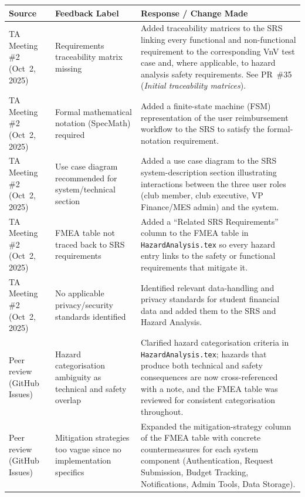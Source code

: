 \documentclass{article}
\begin{document}
\begin{longtable}{p{3.2cm} p{3.8cm} p{7.4cm}}
\toprule
\textbf{Source} & \textbf{Feedback Label} & \textbf{Response / Change Made} \\
\midrule
\endhead

TA Meeting \#2 (Oct~2, 2025)
  & Requirements traceability matrix missing
  & Added traceability matrices to the SRS linking every functional and
    non-functional requirement to the corresponding VnV test case and, where
    applicable, to hazard analysis safety requirements.
    See PR~\#35 (\textit{Initial traceability matrices}).
\\[4pt]

TA Meeting \#2 (Oct~2, 2025)
  & Formal mathematical notation (SpecMath) required
  & Added a finite-state machine (FSM) representation of the user
    reimbursement workflow to the SRS to satisfy the formal-notation
    requirement.
\\[4pt]

TA Meeting \#2 (Oct~2, 2025)
  & Use case diagram recommended for system/technical section
  & Added a use case diagram to the SRS system-description section
    illustrating interactions between the three user roles (club member,
    club executive, VP Finance/MES admin) and the system.
\\[4pt]

TA Meeting \#2 (Oct~2, 2025)
  & FMEA table not traced back to SRS requirements
  & Added a ``Related SRS Requirements'' column to the FMEA table in
    \texttt{HazardAnalysis.tex} so every hazard entry links to the safety
    or functional requirements that mitigate it.
\\[4pt]

TA Meeting \#2 (Oct~2, 2025)
  & No applicable privacy/security standards identified
  & Identified relevant data-handling and privacy standards for student
    financial data and added them to the SRS and Hazard Analysis.
\\[4pt]

Peer review (GitHub Issues)
  & Hazard categorisation ambiguity as technical and safety overlap
  & Clarified hazard categorisation criteria in
    \texttt{HazardAnalysis.tex}; hazards that produce both technical and
    safety consequences are now cross-referenced with a note, and the FMEA
    table was reviewed for consistent categorisation throughout.
\\[4pt]

Peer review (GitHub Issues)
  & Mitigation strategies too vague since no implementation specifics
  & Expanded the mitigation-strategy column of the FMEA table with
    concrete countermeasures for each system component (Authentication,
    Request Submission, Budget Tracking, Notifications, Admin Tools,
    Data Storage).
\\[4pt]


\end{longtable}
\end{document}
